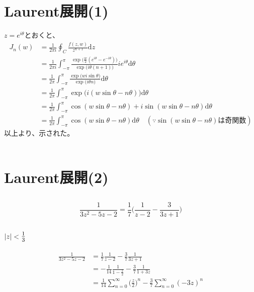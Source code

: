 \documentclass[dvipdfmx,a4paper]{jsarticle}
\begin{document}
\section{Laurent展開(1)}
$z = e^{i\theta}$とおくと、
\begin{align*}
J_n(w) &= \frac{1}{2\pi i}\oint_{C}\frac{f(z,w)}{z^{n+1}}\mathrm{d}z\\
&= \frac{1}{2\pi i}\int_{-\pi}^{\pi}\frac{\exp{\bigl(\frac{w}{2}(e^{i\theta}-e^{-i\theta})\bigr)}}{\exp{\bigl(i\theta(n+1)\bigr)}}ie^{i\theta}\mathrm{d}\theta\\
&=\frac{1}{2\pi}\int_{-\pi}^{\pi}\frac{\exp{\bigl(wi\sin{\theta}\bigr)}}{\exp{\bigl(i\theta n\bigr)}}\mathrm{d}\theta\\
&= \frac{1}{2\pi}\int_{-\pi}^{\pi}\exp{\bigl(i(w\sin{\theta} - n\theta)\bigr)}\mathrm{d}\theta\\
&= \frac{1}{2\pi}\int_{-\pi}^{\pi}\cos{(w\sin{\theta} - n\theta)} + i\sin{(w\sin{\theta} - n\theta)}\mathrm{d}\theta\\
&= \frac{1}{2\pi}\int_{-\pi}^{\pi}\cos{(w\sin{\theta} - n\theta)}\mathrm{d}\theta \quad (\because \sin{(w\sin{\theta} - n\theta)}は奇関数)
\end{align*}
以上より、示された。
\\\\

\section{Laurent展開(2)}
\subsection{}
$$
\frac{1}{3z^2 - 5z -2} = \frac{1}{7}\biggl(\frac{1}{z-2} - \frac{3}{3z+1}\biggr)
$$

\subsection{}
\subsubsection{$|z| < \mbox{\large$\frac{1}{3}$}$}
\begin{align*}
\frac{1}{3z^2 - 5z -2} &= \frac{1}{7}\frac{1}{z-2} - \frac{3}{7}\frac{1}{3z+1}\\
&=-\frac{1}{14}\frac{1}{1 - \frac{z}{2}} - \frac{3}{7}\frac{1}{1 + 3z}\\
&=\frac{1}{14}\sum_{n = 0}^{\infty}\bigl(\frac{z}{2}\bigr)^n - \frac{3}{7}\sum_{n = 0}^{\infty}(-3z)^n
\end{align*}
\end{document}
